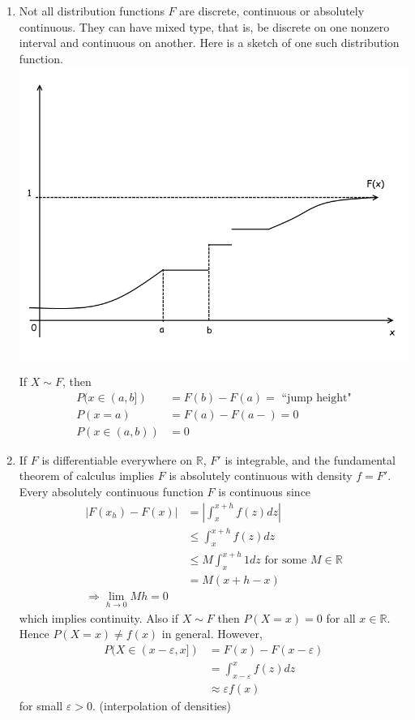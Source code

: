 \documentclass{article}
\newcommand{\R}{\mathbb{R}}
\begin{document}
	\begin{myrem}{}{}
		\begin{enumerate}
			\item Not all distribution functions $F$ are discrete, continuous or absolutely continuous. They can have mixed type, that is, be discrete on one nonzero interval and continuous on another. Here is a sketch of one such distribution function.\\
			\includegraphics[scale=.5]{graph2.png}
			
			If $X\sim F$, then
			\begin{align*}
				P(x\in(a, b])&=F(b)-F(a)=\mbox{ ``jump height"}\\
				P(x=a)&=F(a)-F(a-)=0\\
				P(x\in(a, b))&=0
			\end{align*}
			
			\item If $F$ is differentiable everywhere on $\R$, $F'$ is integrable, and the fundamental theorem of calculus implies $F$ is absolutely continuous with density $f=F'$.\\
			
			Every absolutely continuous function $F$ is continuous since
			\begin{align*}
				|F(x_h)-F(x)|&=|\int_{x}^{x+h}f(z)dz|\\
				&\leq\int_{x}^{x+h}f(z)dz\\
				&\leq M\int_{x}^{x+h}1dz\mbox{ for some $M\in\R$}\\
				&=M(x+h-x)\\
				\Rightarrow\lim_{h\to0}Mh=0
			\end{align*}
			which implies continuity. Also if $X\sim F$ then $P(X=x)=0$ for all $x\in\R$. Hence $P(X=x)\neq f(x)$ in general. However,
			\begin{align*}
				P(X\in(x-\varepsilon, x])&=F(x)-F(x-\varepsilon)\\
				&=\int_{x-\varepsilon}^{x}f(z)dz\\
				&\approx\varepsilon f(x)
			\end{align*}
			for small $\varepsilon>0$. (interpolation of densities)
			\newpage
			

\end{enumerate}
\end{myrem}
\end{document}
